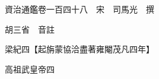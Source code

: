 










 


 
 


 

  
  
  
  
  





  
  
  
  
  
 
  

  

  
  
  



  

 
 

  
   




  

  
  


  　　資治通鑑卷一百四十八　宋　司馬光　撰

　　胡三省　音註

　　梁紀四【起旃蒙協洽盡著雍閹茂凡四年】

　　高祖武皇帝四

